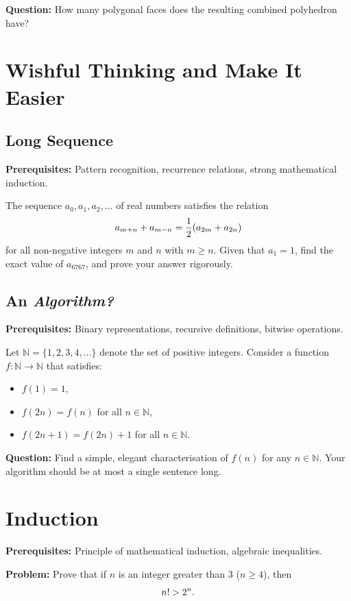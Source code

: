 \documentclass[12pt]{article}
\begin{document}
\textbf{Question:} How many polygonal faces does the resulting combined polyhedron have?

\section{Wishful Thinking and Make It Easier}

\subsection{Long Sequence}
\textbf{Prerequisites:} Pattern recognition, recurrence relations, strong mathematical induction.

The sequence $a_0, a_1, a_2, \ldots$ of real numbers satisfies the relation
\begin{equation}
    a_{m+n} + a_{m-n} = \frac{1}{2}(a_{2m} + a_{2n}) \notag
\end{equation}
for all non-negative integers $m$ and $n$ with $m \ge n$. Given that $a_1 = 1$, find the exact value of $a_{6767}$, and prove your answer rigorously.

\subsection{An \textit{Algorithm?}}
\textbf{Prerequisites:} Binary representations, recursive definitions, bitwise operations.

Let $\mathbb{N} = \{1, 2, 3, 4, \dots\}$ denote the set of positive integers. Consider a function $f: \mathbb{N} \to \mathbb{N}$ that satisfies:
\begin{itemize}
    \item $f(1) = 1$,
    \item $f(2n) = f(n)$ for all $n \in \mathbb{N}$,
    \item $f(2n+1) = f(2n) + 1$ for all $n \in \mathbb{N}$.
\end{itemize}

\textbf{Question:} Find a simple, elegant characterisation of $f(n)$ for any $n \in \mathbb{N}$. Your algorithm should be at most a single sentence long.

\section{Induction}
\textbf{Prerequisites:} Principle of mathematical induction, algebraic inequalities.

\textbf{Problem:} Prove that if $n$ is an integer greater than 3 ($n \ge 4$), then
\begin{equation}
    n! > 2^n. \notag
\end{equation}
\end{document}
